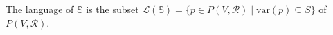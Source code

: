The language of $\mathbb{S}$ is the subset $\mathcal{L}(\mathbb{S}) = \{p \in P(V, \mathcal{R}) \mid \text{var}(p) \subseteq S\}$ of $P(V, \mathcal{R})$.
